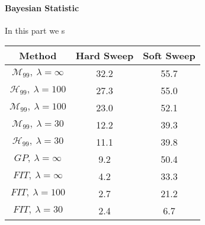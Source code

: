\paragraph{Bayesian Statistic}
In this part we s

\begin{tabular}{c|c|c}
	Method	&Hard Sweep	&Soft Sweep\\\hline
	$\mathcal{M}_{99},\ \lambda=\infty$	&32.2	&55.7\\
	$\mathcal{H}_{99},\ \lambda=100$	&27.3	&55.0\\
	$\mathcal{M}_{99},\ \lambda=100$	&23.0	&52.1\\
	$\mathcal{M}_{99},\ \lambda=30$	&12.2	&39.3\\
	$\mathcal{H}_{99},\ \lambda=30$	&11.1	&39.8\\
	$GP,\ \lambda=\infty$	&9.2	&50.4\\
	$FIT,\ \lambda=\infty$	&4.2	&33.3\\
	$FIT,\ \lambda=100$	&2.7	&21.2\\
	$FIT,\ \lambda=30$	&2.4	&6.7\\
\end{tabular}
